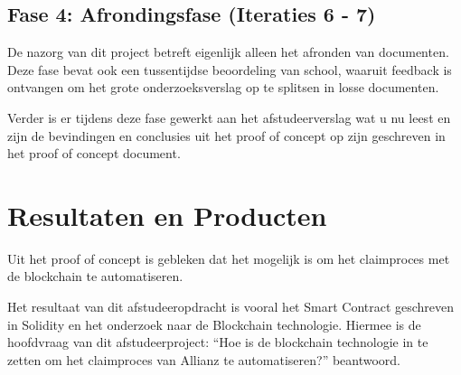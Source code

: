 \subsection{Fase 4: Afrondingsfase (Iteraties 6 - 7)}
De nazorg van dit project betreft eigenlijk alleen het afronden van documenten. Deze fase bevat ook een tussentijdse beoordeling van school, waaruit feedback is ontvangen om het grote onderzoeksverslag op te splitsen in losse documenten.

Verder is er tijdens deze fase gewerkt aan het afstudeerverslag wat u nu leest en zijn de bevindingen en conclusies uit het proof of concept op zijn geschreven in het proof of concept document.

\section{Resultaten en Producten}
Uit het proof of concept is gebleken dat het mogelijk is om het claimproces met de blockchain te automatiseren.\par
Het resultaat van dit afstudeeropdracht is vooral het Smart Contract geschreven in Solidity en het onderzoek naar de Blockchain technologie. Hiermee is de hoofdvraag van dit afstudeerproject: “Hoe is de blockchain technologie in te zetten om het claimproces van Allianz te automatiseren?” beantwoord.\par

